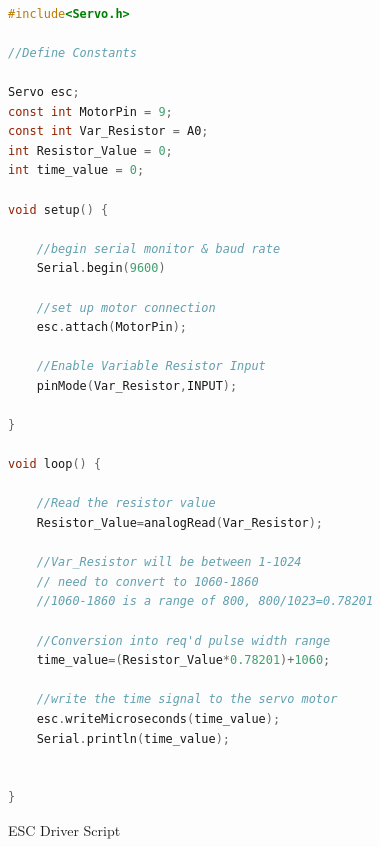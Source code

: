 \begin{figure}[p]
\caption{ESC Driver Script}
\label{fig:ESC_Drive_Script}

\begin{lstlisting}[language=C]

#include<Servo.h>

//Define Constants

Servo esc;
const int MotorPin = 9;
const int Var_Resistor = A0;
int Resistor_Value = 0;
int time_value = 0;

void setup() {
	
	//begin serial monitor & baud rate
	Serial.begin(9600)
	
	//set up motor connection
	esc.attach(MotorPin);  
	
	//Enable Variable Resistor Input
	pinMode(Var_Resistor,INPUT); 
	
}

void loop() {
	
	//Read the resistor value 
	Resistor_Value=analogRead(Var_Resistor);
	
	//Var_Resistor will be between 1-1024
	// need to convert to 1060-1860
	//1060-1860 is a range of 800, 800/1023=0.78201
	
	//Conversion into req'd pulse width range
	time_value=(Resistor_Value*0.78201)+1060;
	
	//write the time signal to the servo motor
	esc.writeMicroseconds(time_value);
	Serial.println(time_value);
	
	
}

\end{lstlisting}
\end{figure}
